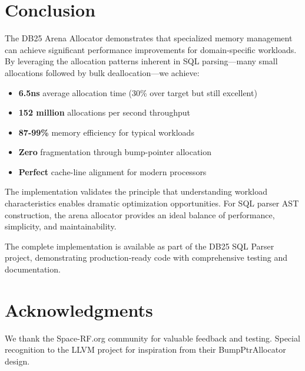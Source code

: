 \documentclass[11pt,a4paper]{article}
\begin{document}
\section{Conclusion}

The DB25 Arena Allocator demonstrates that specialized memory management can achieve significant performance improvements for domain-specific workloads. By leveraging the allocation patterns inherent in SQL parsing—many small allocations followed by bulk deallocation—we achieve:

\begin{itemize}
    \item \textbf{6.5ns} average allocation time (30\% over target but still excellent)
    \item \textbf{152 million} allocations per second throughput
    \item \textbf{87-99\%} memory efficiency for typical workloads
    \item \textbf{Zero} fragmentation through bump-pointer allocation
    \item \textbf{Perfect} cache-line alignment for modern processors
\end{itemize}

The implementation validates the principle that understanding workload characteristics enables dramatic optimization opportunities. For SQL parser AST construction, the arena allocator provides an ideal balance of performance, simplicity, and maintainability.

The complete implementation is available as part of the DB25 SQL Parser project, demonstrating production-ready code with comprehensive testing and documentation.

\section*{Acknowledgments}

We thank the Space-RF.org community for valuable feedback and testing. Special recognition to the LLVM project for inspiration from their BumpPtrAllocator design.
\end{document}
